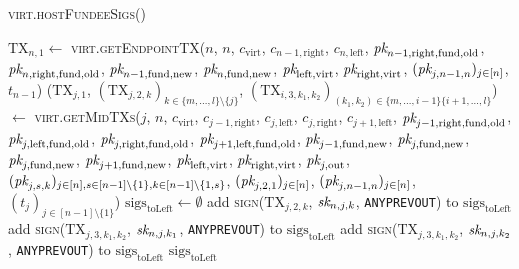 \begin{center}
  \begin{processbox}{\textsc{virt.hostFundeeSigs}()}
    \begin{algorithmic}[1]
      \State $\mathrm{TX}_{n, 1} \gets$
      \textsc{virt}.\textsc{getEndpointTX}($n$, $n$, $c_{\mathrm{virt}}$,
      $c_{n-1, \mathrm{right}}$, $c_{n, \mathrm{left}}$, $\textit{pk}_{n-1,
      \mathrm{right}, \mathrm{fund}, \mathrm{old}}$, $\textit{pk}_{n, \mathrm{right},
      \mathrm{fund}, \mathrm{old}}$, $\textit{pk}_{n-1, \mathrm{fund}, \mathrm{new}}$,
      $\textit{pk}_{n, \mathrm{fund}, \mathrm{new}}$, $\textit{pk}_{\mathrm{left},
      \mathrm{virt}}$, $\textit{pk}_{\mathrm{right}, \mathrm{virt}}$, $(\textit{pk}_{j, n-1,
      n})_{j \in [n]}$, $t_{n-1}$)
      \label{code:virtual-layer:fundee-sigs:tx}
        \State ($\mathrm{TX}_{j, 1}$, $(\mathrm{TX}_{j, 2, k})_{k \in \{m,
        \dots, l\} \setminus \{j\}}$, $(\mathrm{TX}_{i, 3, k_1, k_2})_{(k_1,
        k_2) \in \{m, \dots, i-1\} \{i+1, \dots, l\}}$) $\gets$
        \textsc{virt.getMidTXs}($j$, $n$, $c_{\mathrm{virt}}$, $c_{j-1,
        \mathrm{right}}$, $c_{j, \mathrm{left}}$, $c_{j, \mathrm{right}}$,
        $c_{j+1, \mathrm{left}}$, $\textit{pk}_{j-1, \mathrm{right}, \mathrm{fund},
        \mathrm{old}}$, $\textit{pk}_{j, \mathrm{left}, \mathrm{fund}, \mathrm{old}}$,
        $\textit{pk}_{j, \mathrm{right}, \mathrm{fund}, \mathrm{old}}$, $\textit{pk}_{j+1,
        \mathrm{left}, \mathrm{fund}, \mathrm{old}}$, $\textit{pk}_{j-1, \mathrm{fund},
        \mathrm{new}}$, $\textit{pk}_{j, \mathrm{fund}, \mathrm{new}}$, $\textit{pk}_{j,
        \mathrm{fund}, \mathrm{new}}$, $\textit{pk}_{j+1, \mathrm{fund}, \mathrm{new}}$,
        $\textit{pk}_{\mathrm{left}, \mathrm{virt}}$, $\textit{pk}_{\mathrm{right},
        \mathrm{virt}}$, $\textit{pk}_{j, \mathrm{out}}$, $(\textit{pk}_{j,s,k})_{j \in [n], s \in
        [n-1] \setminus \{1\}, k \in [n-1] \setminus \{1, s\}}$, $(\textit{pk}_{j, 2,
        1})_{j \in [n]}$, $(\textit{pk}_{j, n-1, n})_{j \in [n]}$, $(t_j)_{j \in [n-1]
        \setminus \{1\}}$)
        \State $\mathrm{sigs}_{\mathrm{toLeft}} \gets \emptyset$
          \State add \textsc{sign}($\mathrm{TX}_{j, 2, k}$, $\textit{sk}_{n, j, k}$,
          \texttt{ANYPREVOUT}) to $\mathrm{sigs}_{\mathrm{toLeft}}$
        \EndFor
          \State add \textsc{sign}($\mathrm{TX}_{j, 3, k_1, k_2}$, $\textit{sk}_{n, j,
          k_1}$, \texttt{ANYPREVOUT}) to $\mathrm{sigs}_{\mathrm{toLeft}}$
          \State add \textsc{sign}($\mathrm{TX}_{j, 3, k_1, k_2}$, $\textit{sk}_{n, j,
          k_2}$, \texttt{ANYPREVOUT}) to $\mathrm{sigs}_{\mathrm{toLeft}}$
        \EndFor
      \EndFor
      \State \Return $\mathrm{sigs}_{\mathrm{toLeft}}$
    \end{algorithmic}
  \end{processbox}
  \label{code:virtual-layer:fundee-sigs}
\end{center} \ \\

